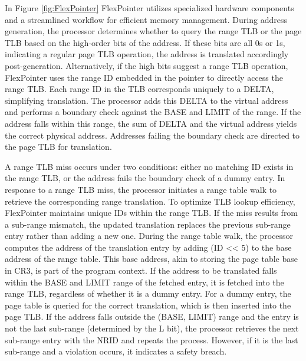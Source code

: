 In Figure \ref{fig:FlexPointer} FlexPointer utilizes specialized hardware components and a streamlined workflow for efficient memory management. During address generation, 
the processor determines whether to query the range TLB or the page TLB based on the high-order bits of the address. 
If these bits are all 0s or 1s, indicating a regular page TLB operation, the address is translated accordingly 
post-generation. Alternatively, if the high bits suggest a range TLB operation, FlexPointer uses the range ID 
embedded in the pointer to directly access the range TLB. Each range ID in the TLB corresponds uniquely to a 
DELTA, simplifying translation. The processor adds this DELTA to the virtual address and performs a boundary check 
against the BASE and LIMIT of the range. If the address falls within this range, the sum of DELTA and the 
virtual address yields the correct physical address. Addresses failing the boundary check are directed to the 
page TLB for translation.

A range TLB miss occurs under two conditions: either no matching ID exists in the range TLB, or the 
address fails the boundary check of a dummy entry. In response to a range TLB miss, the processor 
initiates a range table walk to retrieve the corresponding range translation. To optimize TLB lookup 
efficiency, FlexPointer maintains unique IDs within the range TLB. If the miss results from a sub-range mismatch, 
the updated translation replaces the previous sub-range entry rather than adding a new one. During the 
range table walk, the processor computes the address of the translation entry by adding (ID << 5) to the base address of the 
range table. This base address, akin to storing the page table base in CR3, is part of the program context. If the address to be 
translated falls within the BASE and LIMIT range of the fetched entry, it is fetched into the range TLB, regardless of whether 
it is a dummy entry. For a dummy entry, the page table is queried for the correct translation, which is then inserted 
into the page TLB. If the address falls outside the (BASE, LIMIT) range and the entry is not the last sub-range (determined by the L bit), the processor 
retrieves the next sub-range entry with the NRID and repeats the process. However, if it is the last sub-range and a violation occurs, it 
indicates a safety breach.

